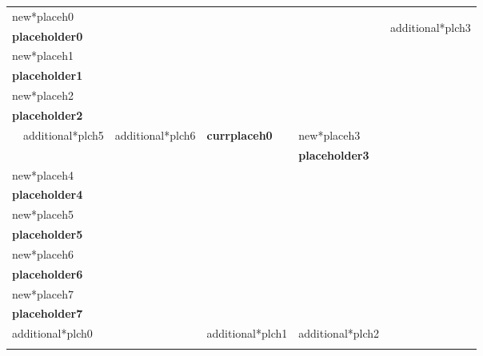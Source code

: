 \documentclass{article}
\begin{document}
\thispagestyle{empty}
\begin{table}[t]
  {\setlength{\tabcolsep}{0.5em}
    \begin{tabularx}{\textwidth}{|Xccll|c|}
      \hline
      \multicolumn{5}{|l|}{new*placeh0} &  \multirow{22}{*}{ \begin{sideways}additional*plch3\end{sideways}} \\
      \multicolumn{5}{|l|}{\textbf{placeholder0}} & \\
      \multicolumn{5}{|l|}{new*placeh1} & \\
      \multicolumn{5}{|l|}{\textbf{placeholder1}} & \\\cline{1-5}
      \multicolumn{5}{|l|}{new*placeh2} & \\
      \multicolumn{5}{|l|}{\textbf{placeholder2}} & \\
      \cline{2-3}\cline{5-5} & \multicolumn{1}{|l|}{additional*plch5} & \multicolumn{1}{l|}{additional*plch6} & \multicolumn{1}{X|}{\centering \textbf{currplaceh0}} & new*placeh3 & \\
      \cline{2-3} &  &  & \multicolumn{1}{l|}{} & \textbf{placeholder3} & \\
      \cline{1-5} \multicolumn{5}{|l|}{new*placeh4} & \\
      \multicolumn{5}{|l|}{\textbf{placeholder4}} & \\
      \multicolumn{5}{|l|}{new*placeh5} & \\
      \multicolumn{5}{|l|}{\textbf{placeholder5}} & \\
      \multicolumn{5}{|l|}{new*placeh6} & \\
      \multicolumn{5}{|l|}{\textbf{placeholder6}} & \\
      \multicolumn{5}{|l|}{new*placeh7} & \\
      \multicolumn{5}{|l|}{\textbf{placeholder7}} & \\\cline{1-5}
      \multicolumn{3}{|l|}{additional*plch0} & \multicolumn{1}{l|}{additional*plch1} & additional*plch2\hspace{20px} & \\\cline{1-5}
      \multicolumn{3}{|l|}{\multirow{3}{*}{}} & \multicolumn{1}{l|}{\multirow{3}{*}{}} & \multirow{3}{*}{} & \\
      \multicolumn{3}{|l|}{} & \multicolumn{1}{l|}{} &  & \\
      \multicolumn{3}{|l|}{} & \multicolumn{1}{l|}{} &  & \\
      \hline
    \end{tabularx}
  }
\end{table}
\end{document}
